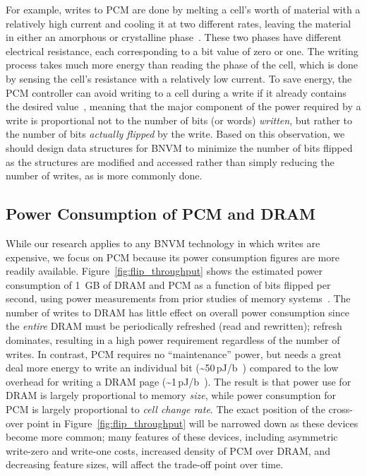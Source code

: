 For example, writes to PCM are done by melting a cell's worth of material with a
relatively high current and cooling it at two different rates, leaving the material
in either an amorphous or crystalline phase~\cite{raoux:ibmjrd08}.  These two
phases have different electrical resistance, each corresponding to a bit value
of zero or one.  The writing process takes much more energy than reading the
phase of the cell, which is done by sensing the cell's resistance with a
relatively low current. To save energy, the PCM controller can avoid writing to
a cell during a write if it already contains the desired
value~\cite{yang:iscas07}, meaning that the major component of the power
required by a write is proportional not to the number of bits (or words)
\emph{written}, but rather to the number of bits \emph{actually flipped} by the
write. Based on this observation, we should design data structures for BNVM to
minimize the number of bits flipped as the structures are modified and accessed
rather than simply reducing the number of writes, as is more commonly done.

\subsection{Power Consumption of PCM and DRAM}

While our research applies to any BNVM technology in which writes are expensive,
we focus on PCM because its power consumption figures are more readily
available. Figure~\ref{fig:flip_throughput} shows the estimated power consumption of 1~GB of DRAM and
PCM as a function of bits flipped per second, using power measurements from
prior studies of memory
systems~\cite{dhiman_pdram:_2009,lee_architecting_2009,xiangyu_dong_nvsim:_2012,qureshi_scalable_2009,Chen_rethinkingdatabase,bittman:nvmsa18}.
The number of writes to DRAM has little effect on overall power consumption
since the \emph{entire} DRAM must be periodically refreshed (read and
rewritten); refresh dominates, resulting in a high power requirement
regardless of the number of writes. In contrast, PCM requires no
``maintenance'' power, but needs a great deal more energy to write an
individual bit (\textasciitilde50\,pJ/b~\cite{bedeschi_8mb_2004}) compared to the
low overhead for writing a DRAM page
(\textasciitilde1\,pJ/b~\cite{lee_architecting_2009}).  The result is that power use
for DRAM is largely proportional to memory \emph{size}, while power consumption
for PCM is largely proportional to \emph{cell change rate}. The exact position of the cross-over
point in Figure~\ref{fig:flip_throughput} will be narrowed down as these devices become more common; many features of these devices,
including asymmetric write-zero and write-one costs, increased density of PCM over DRAM, and
decreasing feature sizes, will affect the trade-off point over time.

